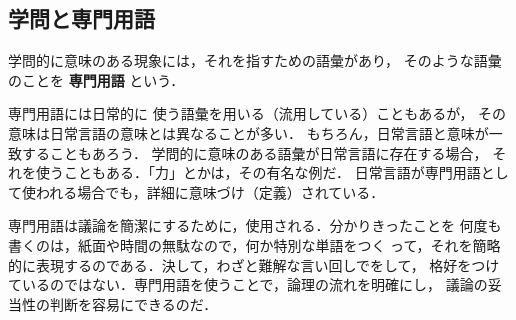         \subsection{学問と専門用語}
            学問的に意味のある現象には，それを指すための語彙があり，
            そのような語彙のことを \textbf{専門用語} という．

            専門用語には日常的に
            使う語彙を用いる（流用している）こともあるが，
            その意味は日常言語の意味とは異なることが多い．
            もちろん，日常言語と意味が一致することもあろう．
            学問的に意味のある語彙が日常言語に存在する場合，
            それを使うこともある．「力」とかは，その有名な例だ．
            日常言語が専門用語として使われる場合でも，詳細に意味づけ（定義）されている．

            専門用語は議論を簡潔にするために，使用される．分かりきったことを
            何度も書くのは，紙面や時間の無駄なので，何か特別な単語をつく
            って，それを簡略的に表現するのである．決して，わざと難解な言い回しでをして，
            格好をつけているのではない．専門用語を使うことで，論理の流れを明確にし，
            議論の妥当性の判断を容易にできるのだ．

